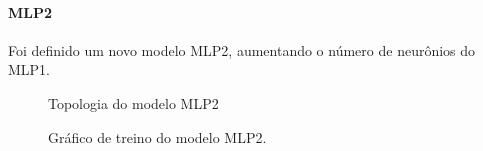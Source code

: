 \documentclass[	12pt, Times, openright, twoside, a4paper, english, brazil]{abntex2}
\begin{document}
    	        \paragraph{MLP2}
    	        Foi definido um novo modelo MLP2, aumentando o número de neurônios do MLP1.
    	        \begin{figure}[!ht]
                	\caption{Topologia do modelo MLP2 \label{fig:case1_mlp1} }
                \end{figure}
                \begin{figure}[!ht]
                	\caption{Gráfico de treino do modelo MLP2. \label{fig:case1_mlp2_train} }
                \end{figure}
\end{document}
